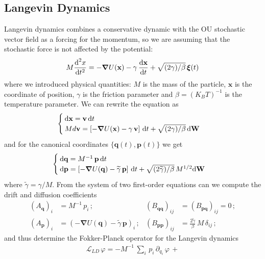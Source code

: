 \documentclass[10pt,a4paper]{book}
\theoremstyle{definition}
\begin{document}
\begin{appendices}
\subsection{Langevin Dynamics}
Langevin dynamics combines a conservative dynamic with the OU stochastic vector field as a forcing for the momentum, so we are assuming that the stochastic force is not affected by the potential:
\begin{equation}
\label{Eq:Lang1Dx}
 M \frac{\mbox{d}^2x}{\mbox{d}t^2} = -\boldsymbol{\nabla} U(\mathbf{x})-\gamma\,\frac{\mbox{d}\mathbf{x}}{\mbox{d}t}+\sqrt{(2\gamma)/\beta}\,\boldsymbol{\xi}(t)
\end{equation}
where we introduced physical quantities: $M$ is the mass of the particle, $\mathbf{x}$ is the coordinate of position, $\gamma$ is the friction parameter and $\beta=\left( K_BT \right)^{-1}$ is the temperature parameter. We can rewrite the equation as
\[
\begin{cases}
 \mbox{d}\mathbf{x}=\mathbf{v}\,\mbox{d} t \\
 Md\mathbf{v}=\left[ -\boldsymbol{\nabla} U(\mathbf{x})-\gamma\,\mathbf{v} \right]\,\mbox{d} t+\sqrt{(2\gamma)/\beta}\,\mbox{d} \mathbf{W}
\end{cases}
\]
and for the canonical coordinates $ \{\mathbf{q}(t),\mathbf{p}(t)\} $ we get 
\begin{equation}
\label{Eq:Lang1Dp}
\begin{cases}
 \mbox{d} \mathbf{q} = M^{-1}\,\mathbf{p}\,\mbox{d} t \\
 \mbox{d} \mathbf{p} = \left[ -\boldsymbol{\nabla} U(\mathbf{q})-\widetilde{\gamma}\,\mathbf{p} \right]\,\mbox{d} t
  +\sqrt{(2\widetilde{\gamma})/\beta}\,M^{1/2}\mbox{d} \mathbf{W}
\end{cases}
\end{equation}
where $\widetilde{\gamma}=\gamma/M$. From the system of two first-order equations can we compute the drift and diffusion coefficients
\begin{align*}
 \left(A_{\mathbf{q}}\right)_i &= M^{-1}\,p_i\,;  &  \left(B_{\mathbf{q}\mathbf{q}}\right)_{ij} &= \left(B_{\mathbf{p}\mathbf{q}}\right)_{ij}=0\,; \\
 \left(A_{\mathbf{p}}\right)_i &= \left(-\boldsymbol{\nabla} U(\mathbf{q})-\widetilde{\gamma}\,\mathbf{p}\right)_i\,;  &  
      \left(B_{\mathbf{p}\mathbf{p}}\right)_{ij} &= \frac{2\widetilde{\gamma}}{\beta}\,M\,\delta_{ij}\,;
\end{align*}
and thus determine the Fokker-Planck operator for the Langevin dynamics
\begin{multline*}
 \mathscr{L}_{LD}\,\varphi=-M^{-1}\,\sum_i\,p_i\,\partial_{q_i}\,\varphi\,+ 

\end{multline*}
\end{appendices}
\end{document}
